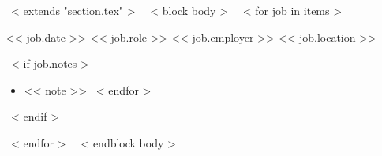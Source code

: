 ~< extends "section.tex" >~
~< block body >~
  ~< for job in items >~
    \begin{samepage}
      \cventry
        {<< job.date >>}
        {<< job.role >>}
        {<< job.employer >>}
        {<< job.location >>}
        {}
        { %
        ~< if job.notes >~
          \begin{itemize}
            ~< for note in job.notes >~
              \item{<< note >>}
            ~< endfor >~
          \end{itemize}
        ~< endif >~
        }
    \end{samepage}
    \vspace{10pt}
  ~< endfor >~
  \vspace{-10pt}
~< endblock body >~

